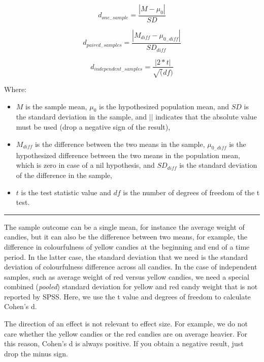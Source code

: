 \documentclass[a4paper]{book}
\theoremstyle{definition}
\theoremstyle{definition}
\theoremstyle{definition}
\theoremstyle{remark}
\begin{document}
\begin{equation}
  d_{one_-sample} = \frac{|M - \mu_0|}{SD}
\end{equation}

\begin{equation}
  d_{paired_-samples} = \frac{|M_{diff} - \mu_{0_-diff}|}{SD_{diff}}
\end{equation}

\begin{equation}
  d_{independent_-samples} = \frac{|2*t|}{\sqrt(df)}
\end{equation}

Where:

\begin{itemize}
\item
  \(M\) is the sample mean, \(\mu_0\) is the hypothesized population
  mean, and \(SD\) is the standard deviation in the sample, and \(||\)
  indicates that the absolute value must be used (drop a negative sign
  of the result),
\item
  \(M_{diff}\) is the difference between the two means in the sample,
  \(\mu_{0_-diff}\) is the hypothesized difference between the two means
  in the population mean, which is zero in case of a nil hypothesis, and
  \(SD_{diff}\) is the standard deviation of the difference in the
  sample,
\item
  \(t\) is the test statistic value and \(df\) is the number of degrees
  of freedom of the t test.
\end{itemize}

\begin{center}\rule{0.5\linewidth}{\linethickness}\end{center}

The sample outcome can be a single mean, for instance the average weight
of candies, but it can also be the difference between two means, for
example, the difference in colourfulness of yellow candies at the
beginning and end of a time period. In the latter case, the standard
deviation that we need is the standard deviation of colourfulness
difference across all candies. In the case of independent samples, such
as average weight of red versus yellow candies, we need a special
combined (\emph{pooled}) standard deviation for yellow and red candy
weight that is not reported by SPSS. Here, we use the t value and
degrees of freedom to calculate Cohen's d.

The direction of an effect is not relevant to effect size. For example,
we do not care whether the yellow candies or the red candies are on
average heavier. For this reason, Cohen's d is always positive. If you
obtain a negative result, just drop the minus sign.
\end{document}

